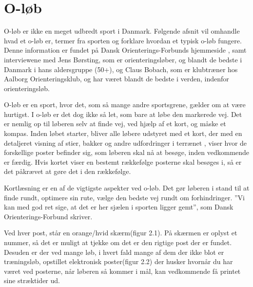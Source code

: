 \section{O-løb}
O-løb er ikke en meget udbredt sport i Danmark. Følgende afsnit vil omhandle hvad et o-løb er, termer fra sporten og forklare hvordan et typisk o-løb fungere. Denne information er fundet på Dansk Orienterings-Forbunds hjemmeside \citep{DOF}, samt interviewene med Jens Børsting, som er orienteringsløber, og blandt de bedste i Danmark i hans aldersgruppe (50+), og Claus Bobach, som er klubtræner hos Aalborg Orienteringsklub, og har været blandt de bedste i verden, indenfor orienteringsløb.

O-løb er en sport, hvor det, som så mange andre sportsgrene, gælder om at være hurtigst. I o-løb er det dog ikke så let, som bare at løbe den markerede vej. Det er nemlig op til løberen selv at finde vej, ved hjælp af et kort, og måske et kompas. Inden løbet starter, bliver alle løbere udstyret med et kort, der med en detaljeret visning af stier, bakker og andre udfordringer i terrænet , viser hvor de forskellige poster befinder sig, som løberen skal nå at besøge, inden vedkommende er færdig. Hvis kortet viser en bestemt rækkefølge posterne skal besøges i, så er det påkrævet at gøre det i den rækkefølge. 

Kortlæsning er en af de vigtigste aspekter ved o-løb. Det gør løberen i stand til at finde rundt, optimere sin rute, vælge den bedste vej rundt om forhindringer. ”Vi kan med god ret sige, at det er her sjælen i sporten ligger gemt”, som Dansk Orienterings-Forbund skriver.   

Ved hver post, står en  orange/hvid skærm(figur 2.1). På skærmen er oplyst et nummer, så det er muligt at tjekke om det er den rigtige post der er fundet. Desuden er der ved mange løb, i hvert fald mange af dem der ikke blot er træningsløb, opstillet elektronisk poster(figur 2.2) der husker hvornår du har været ved posterne, når løberen så kommer i mål, kan vedkommende få printet sine stræktider ud.

